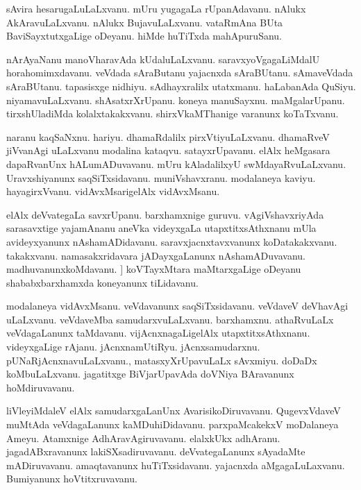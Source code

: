 \documentclass{article}
\begin{document}
\begin{mn}%
sAvira hesarugaLuLaLxvanu. mUru yugagaLa rUpanAdavanu. nAlukx AkAravuLaLxvanu. nAlukx 
BujavuLaLxvanu. vataRmAna BUta BaviSayxtutxgaLige oDeyanu. hiMde huTiTxda mahApuruSanu.
\end{mn}

\begin{mn}%
nArAyaNanu manoVharavAda kUdaluLaLxvanu. saravxyoVgagaLiMdalU horahomimxdavanu. veVdada sAraButanu 
yajacnxda sAraBUtanu. sAmaveVdada sAraBUtanu. tapasisxge nidhiyu. sAdhayxralilx utatxmanu. 
haLabanAda QuSiyu. niyamavuLaLxvanu. shAsatxrXrUpanu. koneya manuSayxnu. maMgalarUpanu. 
tirxshUladiMda kolalxtakakxvanu. shirxVkaMThanige varanunx koTaTxvanu.
\end{mn}

\begin{mn}%
naranu kaqSaNxnu. hariyu. dhamaRdalilx pirxVtiyuLaLxvanu. dhamaRveV jiVvanAgi uLaLxvanu modalina 
kataqvu. satayxrUpavanu. elAlx heMgasara dapaRvanUnx hALumADuvavanu. mUru kAladalilxyU 
swMdayaRvuLaLxvanu. Uravxshiyanunx saqSiTxsidavanu. muniVshavxranu. modalaneya kaviyu. 
hayagirxVvanu. vidAvxMsarigelAlx vidAvxMsanu.
\end{mn}

\begin{mn}%
elAlx deVvategaLa savxrUpanu. barxhamxnige guruvu. vAgiVshavxriyAda sarasavxtige yajamAnanu aneVka 
videyxgaLa utapxtitxsAthxnanu mUla avideyxyanunx nAshamADidavanu. saravxjacnxtavxvanunx 
koDatakakxvanu. takakxvanu. namasakxridavara jADayxgaLanunx nAshamADuvavanu. madhuvanunxkoMdavanu. ]
koVTayxMtara maMtarxgaLige oDeyanu shababxbarxhamxda koneyanunx tiLidavanu.
\end{mn}

\begin{mn}%
modalaneya vidAvxMsanu. veVdavanunx saqSiTxsidavanu. veVdaveV deVhavAgi uLaLxvanu. veVdaveMba 
samudarxvuLaLxvanu. barxhamxnu. athaRvuLaLx  veVdagaLanunx taMdavanu. vijAcnxnagaLigelAlx 
utapxtitxsAthxnanu. videyxgaLige rAjanu. jAcnxnamUtiRyu. jAcnxsamudarxnu. pUNaRjAcnxnavuLaLxvanu., 
matasxyXrUpavuLaLx sAvxmiyu. doDaDx koMbuLaLxvanu. jagatitxge BiVjarUpavAda doVNiya BAravanunx 
hoMdiruvavanu.
\end{mn}

\begin{mn}%
liVleyiMdaleV elAlx samudarxgaLanUnx AvarisikoDiruvavanu. QugevxVdaveV muMtAda veVdagaLanunx 
kaMDuhiDidavanu. parxpaMcakekxV moDalaneya Ameyu. Atamxnige AdhAravAgiruvavanu. elalxkUkx 
adhAranu. jagadABxravanunx lakiSXsadiruvavanu. deVvategaLanunx sAyadaMte mADiruvavanu. 
amaqtavanunx huTiTxsidavanu. yajacnxda aMgagaLuLaxvanu. Bumiyanunx hoVtitxruvavanu.
\end{mn}
\end{document}

